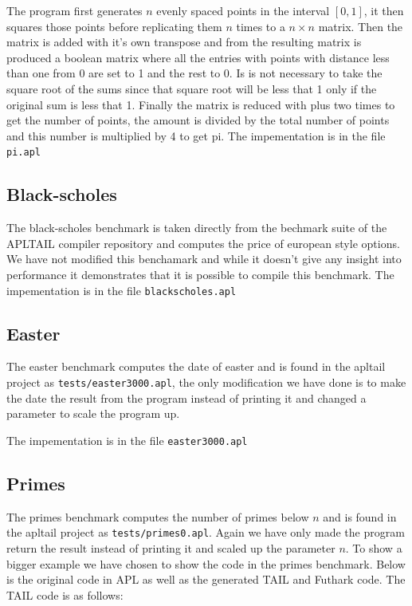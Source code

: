 \documentclass[11pt]{article}
\begin{document}
The program first generates $n$ evenly spaced points in the interval $[0,1]$, it then squares those points before replicating them $n$ times to a $n \times n$ matrix.
Then the matrix is added with it's own transpose and from the resulting matrix is produced a boolean matrix
where all the entries with points with distance less than one from 0 are set to 1 and the rest to 0. Is is not necessary to take
the square root of the sums since that square root will be less that 1 only if the original sum is less that 1.
Finally the matrix is reduced with plus two times to get the number of points, the amount is divided by the total number of points and
this number is multiplied by 4 to get pi.
The impementation is in the file {\tt pi.apl}

\subsection{Black-scholes}
The black-scholes benchmark is taken directly from the bechmark suite of the APLTAIL compiler repository and computes the price of european style options. We have not modified this benchamark and while it doesn't give any insight into performance it demonstrates
that it is possible to compile this benchmark. 
The impementation is in the file {\tt blackscholes.apl}

\subsection{Easter}
The easter benchmark computes the date of easter and is found in the apltail project as {\tt tests/easter3000.apl}, the only
modification we have done is to make the date the result from the program instead of printing it and changed a parameter to scale
the program up.

The impementation is in the file {\tt easter3000.apl}

\subsection{Primes}
The primes benchmark computes the number of primes below $n$ and is found in the apltail project as {\tt tests/primes0.apl}.
Again we have only made the program return the result instead of printing it and scaled up the parameter $n$.
To show a bigger example we have chosen to show the code in the primes benchmark. Below is the original code in APL as well as the generated TAIL and Futhark code.
The TAIL code is as follows:
\end{document}
